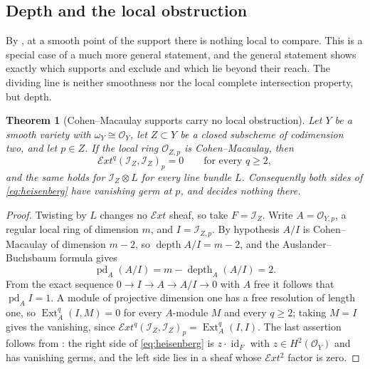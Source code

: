 \documentclass[11pt,reqno]{amsart}
\theoremstyle{plain}
\newtheorem{theorem}{Theorem}[section]
\theoremstyle{definition}
\theoremstyle{remark}
\newcommand{\cE}{\mathcal{E}}
\newcommand{\cO}{\mathcal{O}}
\newcommand{\cI}{\mathcal{I}}
\DeclareMathOperator{\Ext}{Ext}
\DeclareMathOperator{\id}{id}
\begin{document}
\subsection{Depth and the local obstruction}
\label{ssec:depth}

By , at a smooth point of the support there is
nothing local to compare. This is a special case of a much more general
statement, and the general statement shows exactly which supports
 and  exclude and which
lie beyond their reach. The dividing line is neither smoothness nor the local
complete intersection property, but depth.

\begin{theorem}[Cohen--Macaulay supports carry no local obstruction]%
\label{thm:cmvanishing}
Let $Y$ be a smooth variety with $\omega_{Y}\cong\cO_{Y}$, let $Z\subset Y$ be
a closed subscheme of codimension two, and let $p\in Z$. If the local ring
$\cO_{Z,p}$ is Cohen--Macaulay, then
\[
  \cE xt^{q}(\cI_{Z},\cI_{Z})_{p}=0\qquad\text{for every }q\ge2 ,
\]
and the same holds for $\cI_{Z}\otimes L$ for every line bundle $L$.
Consequently both sides of \eqref{eq:heisenberg} have vanishing germ at $p$,
and  decides nothing there.
\end{theorem}

\begin{proof}
Twisting by $L$ changes no $\cE xt$ sheaf, so take $F=\cI_{Z}$. Write
$A=\cO_{Y,p}$, a regular local ring of dimension $m$, and $I=\cI_{Z,p}$. By
hypothesis $A/I$ is Cohen--Macaulay of dimension $m-2$, so
$\operatorname{depth}A/I=m-2$, and the Auslander--Buchsbaum formula gives
\[
  \operatorname{pd}_{A}(A/I)=m-\operatorname{depth}_{A}(A/I)=2 .
\]
From the exact sequence $0\to I\to A\to A/I\to0$ with $A$ free it follows that
$\operatorname{pd}_{A}I=1$. A module of projective dimension one has a free
resolution of length one, so $\Ext^{q}_{A}(I,M)=0$ for every $A$-module $M$
and every $q\ge2$; taking $M=I$ gives the vanishing, since
$\cE xt^{q}(\cI_{Z},\cI_{Z})_{p}=\Ext^{q}_{A}(I,I)$. The last assertion
follows from : the right side of \eqref{eq:heisenberg} is
$z\cdot\id_{F}$ with $z\in H^{2}(\cO_{Y})$ and has vanishing germs, and the
left side lies in a sheaf whose $\cE xt^{2}$ factor is zero.
\end{proof}
\end{document}
